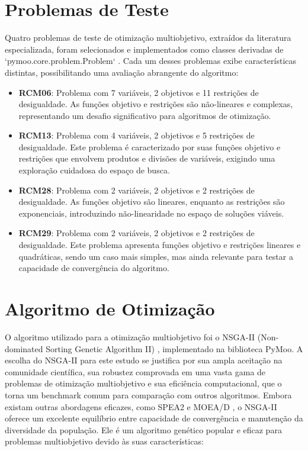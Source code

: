 \documentclass[12pt,openright,oneside,a4paper,english,brazil]{abntex2}
\begin{document}
\section{Problemas de Teste}
Quatro problemas de teste de otimização multiobjetivo, extraídos da literatura especializada, foram selecionados e implementados como classes derivadas de `pymoo.core.problem.Problem` \cite{pymoo}. Cada um desses problemas exibe características distintas, possibilitando uma avaliação abrangente do algoritmo:
\begin{itemize}
    \item \textbf{RCM06}: Problema com 7 variáveis, 2 objetivos e 11 restrições de desigualdade. As funções objetivo e restrições são não-lineares e complexas, representando um desafio significativo para algoritmos de otimização.
    \item \textbf{RCM13}: Problema com 4 variáveis, 2 objetivos e 5 restrições de desigualdade. Este problema é caracterizado por suas funções objetivo e restrições que envolvem produtos e divisões de variáveis, exigindo uma exploração cuidadosa do espaço de busca.
    \item \textbf{RCM28}: Problema com 2 variáveis, 2 objetivos e 2 restrições de desigualdade. As funções objetivo são lineares, enquanto as restrições são exponenciais, introduzindo não-linearidade no espaço de soluções viáveis.
    \item \textbf{RCM29}: Problema com 2 variáveis, 2 objetivos e 2 restrições de desigualdade. Este problema apresenta funções objetivo e restrições lineares e quadráticas, sendo um caso mais simples, mas ainda relevante para testar a capacidade de convergência do algoritmo.
\end{itemize}

\section{Algoritmo de Otimização}
O algoritmo utilizado para a otimização multiobjetivo foi o NSGA-II (Non-dominated Sorting Genetic Algorithm II) \cite{deb2002fast}, implementado na biblioteca PyMoo. A escolha do NSGA-II para este estudo se justifica por sua ampla aceitação na comunidade científica, sua robustez comprovada em uma vasta gama de problemas de otimização multiobjetivo e sua eficiência computacional, que o torna um benchmark comum para comparação com outros algoritmos. Embora existam outras abordagens eficazes, como SPEA2 \cite{zitzler2001spea2} e MOEA/D \cite{li2009multiobjective}, o NSGA-II oferece um excelente equilíbrio entre capacidade de convergência e manutenção da diversidade da população. Ele é um algoritmo genético popular e eficaz para problemas multiobjetivo devido às suas características:
\end{document}
